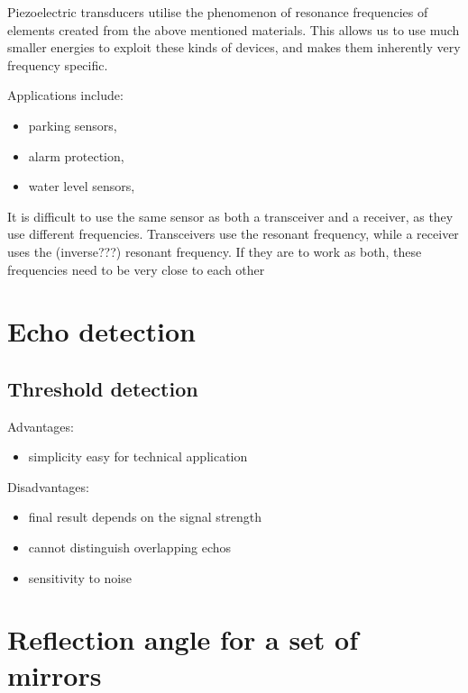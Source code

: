 Piezoelectric transducers utilise the phenomenon of resonance frequencies of elements created from the above mentioned materials. This allows us to use much smaller energies to exploit these kinds of devices, and makes them inherently very frequency specific.

Applications include:
\begin{itemize}
        \item parking sensors,
        \item alarm protection,
        \item water level sensors,
\end{itemize}


It is difficult to use the same sensor as both a transceiver and a receiver, as they use different frequencies. Transceivers use the resonant frequency, while a receiver uses the (inverse???) resonant frequency. If they are to work as both, these frequencies need to be very close to each other







\section{Echo detection}

\subsection{Threshold detection}

Advantages:
\begin{itemize}
        \item simplicity
            \iyrm easy for technical application
        
\end{itemize}

Disadvantages:
\begin{itemize}
        \item final result depends on the signal strength
        \item cannot distinguish overlapping echos
        \item sensitivity to noise
\end{itemize}


\section{Reflection angle for a set of mirrors}
\subsection{}

